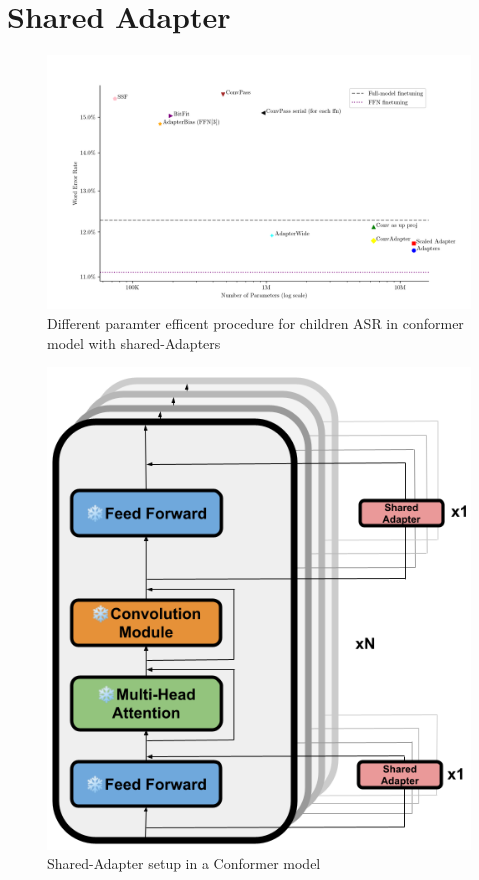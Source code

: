 \section{Shared Adapter}
\begin{figure}
    \begin{center}
        \includegraphics[width=\textwidth]{imgs/Adapters_compare.png}
        \caption{Different paramter efficent procedure for children ASR in conformer model with shared-Adapters}
        \label{fig:adapter_compared}
    \end{center}
\end{figure}
\begin{figure}
    \begin{center}
        \includegraphics[scale=0.3]{imgs/Shared_Adapters.png}
        \caption{Shared-Adapter setup in a Conformer model}
        \label{fig:Shared_adapter}
    \end{center}
\end{figure}


